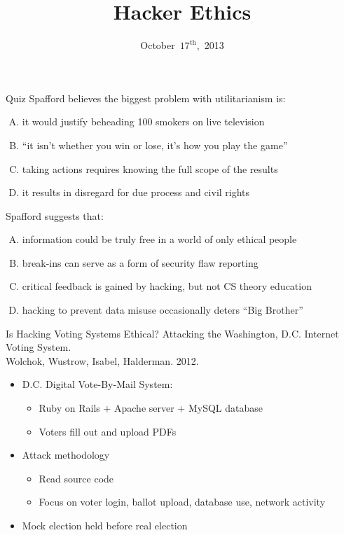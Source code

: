 \documentclass{beamer}
\title{Hacker Ethics}
\date{October~$17^{\text{th}}$,~2013}
\begin{document}
\begin{frame}
\titlepage
\end{frame}

\begin{frame}{Quiz}
Spafford believes the biggest problem with utilitarianism is:
\begin{enumerate}[(A)]
\item<1> it would justify beheading 100 smokers on live television
\item<1> ``it isn't whether you win or lose, it's how you play the game''
\item<1-2> taking actions requires knowing the full scope of the results
\item<1> it results in disregard for due process and civil rights
\end{enumerate}
\bigskip
Spafford suggests that:
\begin{enumerate}[(A)]
\item<1-2> information could be truly free in a world of only ethical people
\item<1> break-ins can serve as a form of security flaw reporting %
\item<1> critical feedback is gained by hacking, but not CS theory education %
\item<1> hacking to prevent data misuse occasionally deters ``Big Brother''
\end{enumerate}
\end{frame}

\begin{frame}{Is Hacking Voting Systems Ethical?}
Attacking the Washington, D.C. Internet Voting System. \\
Wolchok, Wustrow, Isabel, Halderman. 2012.
\begin{itemize}
\item D.C. Digital Vote-By-Mail System:
\begin{itemize}
\item Ruby on Rails + Apache server + MySQL database
\item Voters fill out and upload PDFs
\end{itemize}
\item Attack methodology
\begin{itemize}
\item Read source code
\item Focus on voter login, ballot upload, database use, network activity
\end{itemize}
\item Mock election held before real election
\end{itemize}
\end{frame}
\end{document}
